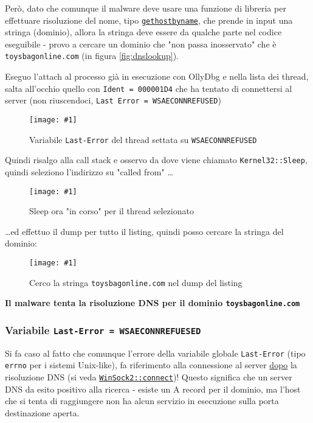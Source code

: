 \documentclass[
    a4paper, %
    11pt %
]{article}
\newcommand{\pic}[4]{\begin{figure}[H]
            \centering
            \texttt{[image: \#1]}
            \caption{#2}
            \label{fig:#1}
            \end{figure}}
\begin{document}
            Però, dato che comunque il malware deve usare una funzione di libreria per effettuare risoluzione
            del nome, tipo 
            \href{https://learn.microsoft.com/it-it/windows/win32/api/winsock/nf-winsock-gethostbyname}{\texttt{gethostbyname}}, che prende in input una stringa (dominio), allora la stringa deve essere
            da qualche parte nel codice eseguibile - provo a cercare un dominio che "non passa inosservato" che è
            \texttt{toysbagonline.com} (in figura \ref{fig:dnslookup}).

            Eseguo l'attach al processo già in esecuzione con OllyDbg e nella lista dei thread,
            salta all'occhio quello con \texttt{Ident = 000001D4} che ha tentato di connettersi al server (non riuscendoci, \texttt{Last Error = WSAECONNREFUSED})

            \pic{wsaeconnrefused}{Variabile \texttt{Last-Error} del thread settata su \texttt{WSAECONNREFUSED}}{18cm}{4cm}

            Quindi risalgo alla call stack e osservo da
            dove viene chiamato \texttt{Kernel32::Sleep}, quindi seleziono l'indirizzo su "called from" \dots

            \pic{wsaeconnrefused_sleep}{Sleep ora "in corso" per il thread selezionato}{17cm}{5cm}

            \dots ed effettuo il dump per tutto il listing, quindi posso cercare la stringa del dominio:

            \pic{wsaeconnrefused_dump}{Cerco la stringa \texttt{toysbagonline.com} nel dump del listing}
            {18cm}{12cm}

            \textbf{Il malware tenta la risoluzione DNS per il dominio \texttt{toysbagonline.com}}

            \subsubsection{Variabile \texttt{Last-Error = WSAECONNREFUESED}}

            Si fa caso al fatto che comunque l'errore della variabile globale \texttt{Last-Error} (tipo 
            \texttt{errno} per i sistemi Unix-like), fa riferimento alla connessione al server \underline{dopo} 
            la risoluzione
            DNS (si veda \href{https://learn.microsoft.com/it-it/windows/win32/api/winsock2/nf-winsock2-connect}
            {\texttt{WinSock2::connect}})! Questo significa che un server DNS da esito positivo alla ricerca -
            esiste un A record per il dominio, ma l'host che si tenta di raggiungere non ha alcun servizio
            in esecuzione sulla porta destinazione aperta.
            
\end{document}
